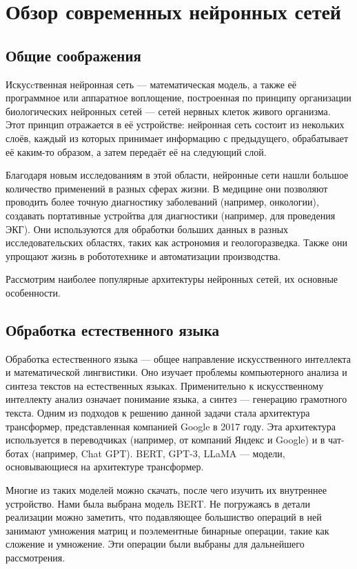 \section{Обзор современных нейронных сетей}
\label{sec:Neuronets} 

\subsection{Общие соображения}

Искусcтвенная нейронная сеть --- математическая модель, а также её программное или
аппаратное воплощение, построенная по принципу организации биологических нейронных
сетей --- сетей нервных клеток живого организма. Этот принцип отражается в её
устройстве: нейронная сеть состоит из некольких слоёв, каждый из которых принимает
информацию с предыдущего, обрабатывает её каким-то образом, а  затем передаёт её
на следующий слой.

Благодаря новым исследованиям в этой области, нейронные сети нашли большое
количество применений в разных сферах жизни. В медицине они позволяют проводить
более точную диагностику заболеваний (например, онкологии), создавать портативные
устройтва для диагностики (например, для проведения ЭКГ). Они используются
для обработки больших данных в разных исследовательских областях, таких как
астрономия и геологоразведка. Также они упрощают жизнь в робототехнике и
автоматизации производства.

Рассмотрим наиболее популярные архитектуры нейронных сетей, их основные особенности.

\subsection{Обработка естественного языка}

Обработка естественного языка --- общее направление искусственного интеллекта и
математической лингвистики. Оно изучает проблемы компьютерного анализа и синтеза
текстов на естественных языках. Применительно к искусственному интеллекту анализ
означает понимание языка, а синтез --- генерацию грамотного текста. Одним из
подходов к решению данной задачи стала архитектура трансформер, представленная
компанией Google в 2017 году. Эта архитектура используется в переводчиках
(например, от компаний Яндекс и Google) и в чат-ботах (например, Chat GPT).
BERT, GPT-3, LLaMA --- модели, основывающиеся на архитектуре трансформер.

Многие из таких моделей можно скачать, после чего изучить их внутреннее
устройство. Нами была выбрана модель BERT. Не погружаясь в детали реализации
можно заметить, что подавляющее большиство операций в ней занимают
умножения матриц и поэлементные бинарные операции, такие как сложение и
умножение. Эти операции были выбраны для дальнейшего рассмотрения.

